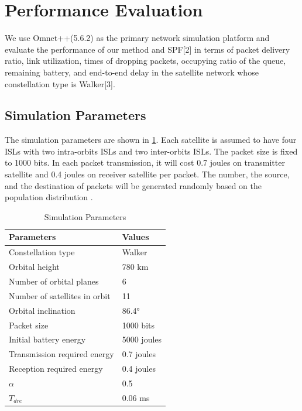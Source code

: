 \section{Performance Evaluation}
We use Omnet++(5.6.2) as the primary network simulation platform and evaluate the performance of our method and SPF[2] in terms of packet delivery ratio, link utilization, times of dropping packets, occupying ratio of the queue, remaining battery, and end-to-end delay in the satellite network whose constellation type is Walker[3].

\subsection{Simulation Parameters}
The simulation parameters are shown in \ref{table:PARAMETERS}. Each satellite is assumed to have four ISLs with two intra-orbits ISLs and two inter-orbits ISLs. The packet size is fixed to 1000 bits. In each packet transmission, it will cost 0.7 joules on transmitter satellite and 0.4 joules on receiver satellite per packet. The number, the source, and the destination of packets will be generated randomly based on the population distribution \cite{TRAFFICDENSITY}.

\begin{table}[h]
	\caption{Simulation Parameters}
	\label{table:PARAMETERS}
\begin{center}
\begin{tabular}{|l|l|}
\hline
\textbf{Parameters} & \textbf{Values}           \\  \hline
Constellation type            & Walker          \\ \hline
Orbital height                & 780 km          \\ \hline
Number of orbital planes      & 6               \\ \hline
Number of satellites in orbit & 11              \\ \hline
Orbital inclination           & 86.4°           \\ \hline
Packet size                   & 1000 bits       \\ \hline
Initial battery energy        & 5000 joules     \\ \hline
Transmission required energy  & 0.7  joules     \\ \hline
Reception required energy     & 0.4  joules     \\ \hline
$\alpha$                      & 0.5             \\ \hline
$T_{dre}$                     & 0.06 ms       \\ \hline
\end{tabular}
\end{center}
\end{table}

